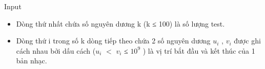 Input
\begin{itemize}
	\item Dòng thứ nhất chứa số nguyên dương k (k ≤ 100) là số lượng test.
	\item Dòng thứ i trong số k dòng tiếp theo chứa 2 số nguyên dương $u_{i}$ , $v_{i}$ được ghi cách nhau bởi dấu cách ($u_{i}$ $<$ $v_{i}$ ≤ $10^{9}$ ) là vị trí bắt đầu và kết thúc của 1 bản nhạc.
\end{itemize}